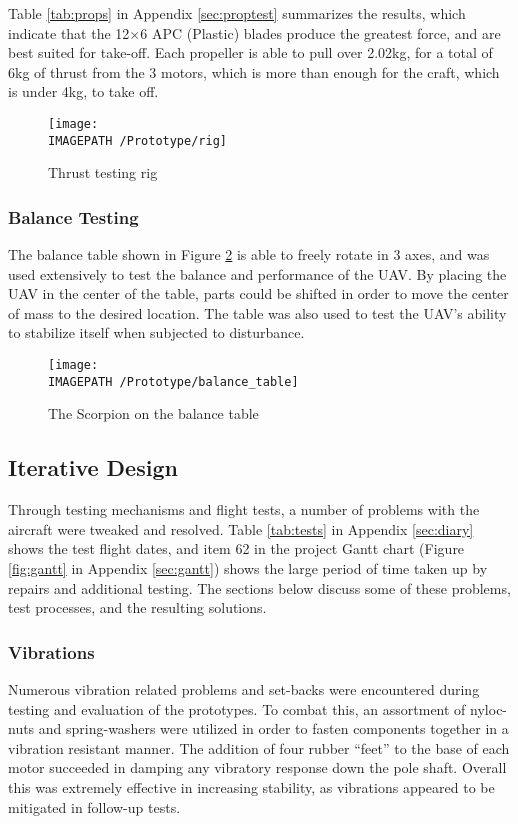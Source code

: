 Table \ref{tab:props} in Appendix \ref{sec:proptest} summarizes the results, which indicate that the 12$\times$6 APC (Plastic) blades produce the greatest force, and are best suited for take-off. Each propeller is able to pull over 2.02kg, for a total of 6kg of thrust from the 3 motors, which is more than enough for the craft, which is under 4kg, to take off.

\begin{figure}[!ht]
	\centering
	\texttt{[image: \\IMAGEPATH /Prototype/rig]}
	\caption{Thrust testing rig}
	\label{fig:rig}
\end{figure}

\subsubsection*{Balance Testing}
The balance table shown in Figure \ref{fig:balance_table} is able to freely rotate in 3 axes, and was used extensively to test the balance and performance of the UAV. By placing the UAV in the center of the table, parts could be shifted in order to move the center of mass to the desired location. The table was also used to test the UAV's ability to stabilize itself when subjected to disturbance.

\begin{figure}[!ht]
	\centering
	\texttt{[image: \\IMAGEPATH /Prototype/balance\_table]}
	\caption{The Scorpion on the balance table}
	\label{fig:balance_table}
\end{figure}

\subsection{Iterative Design}
Through testing mechanisms and flight tests, a number of problems with the aircraft were tweaked and resolved. Table \ref{tab:tests} in Appendix \ref{sec:diary} shows the test flight dates, and item 62 in the project Gantt chart (Figure \ref{fig:gantt} in Appendix \ref{sec:gantt}) shows the large period of time taken up by repairs and additional testing. The sections below discuss some of these problems, test processes, and the resulting solutions.

\subsubsection*{Vibrations}
Numerous vibration related problems and set-backs were encountered during testing and evaluation of the prototypes. To combat this, an assortment of nyloc-nuts and spring-washers were utilized in order to fasten components together in a vibration resistant manner. The addition of four rubber ``feet'' to the base of each motor succeeded in damping any vibratory response down the pole shaft. Overall this was extremely effective in increasing stability, as vibrations appeared to be mitigated in follow-up tests.

